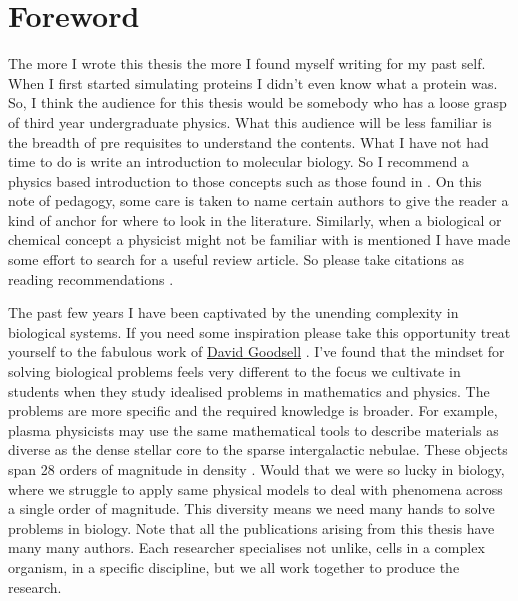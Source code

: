 \chapter*{Foreword}
\setcounter{page}{1}
\label{chap:foreword}
\vspace

The more I wrote this thesis the more I found myself writing for my past self. When I first started simulating proteins I didn't even know what a protein was. So, I think the audience for this thesis would be somebody who has a loose grasp of third year undergraduate physics. What this audience will be less familiar is the breadth of pre requisites to understand the contents. What I have not had time to do is write an introduction to molecular biology. So I recommend a physics based introduction to those concepts such as those found in \cite{phillips2012}. On this note of pedagogy, some care is taken to name certain authors to give the reader a kind of anchor for where to look in the literature. Similarly, when a biological or chemical concept a physicist might not be familiar with is mentioned I have made some effort to search for a useful review article. So please take citations as reading recommendations \cite{dawkins1989, hofstadter1999}.

The past few years I have been captivated by the unending complexity in biological systems. If you need some inspiration please take this opportunity treat yourself to the fabulous work of \href {https://pdb101.rcsb.org/sci-art/goodsell-gallery}{David Goodsell} \cite{goodsell2009, goodsell2018, goodsell2020}. I've found that the mindset for solving biological problems feels very different to the focus we cultivate in students when they study idealised problems in mathematics and physics. The problems are more specific and the required knowledge is broader. For example, plasma physicists may use the same mathematical tools to describe materials as diverse as the dense stellar core to the sparse intergalactic nebulae. These objects span 28 orders of magnitude in density \cite{chen2018}. Would that we were so lucky in biology, where we struggle to apply same physical models to deal with phenomena across a single order of magnitude. This diversity means we need many hands to solve problems in biology. Note that all the publications arising from this thesis have many many authors. Each researcher specialises not unlike, cells in a complex organism, in a specific discipline, but we all work together to produce the research.

